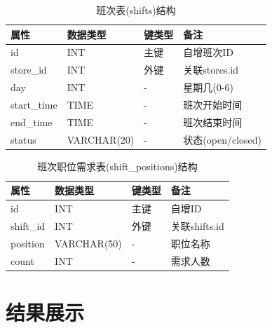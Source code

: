 \documentclass{ctexart}
\begin{document}
\begin{table}[H]
    \centering
    \caption{班次表(shifts)结构}
    \label{tab:shifts-table}
    \begin{tabular}{llll}
    \toprule
    属性 & 数据类型 & 键类型 & 备注 \\
    \midrule
    id & INT & 主键 & 自增班次ID \\
    store\_id & INT & 外键 & 关联stores.id \\
    day & INT & - & 星期几(0-6) \\
    start\_time & TIME & - & 班次开始时间 \\
    end\_time & TIME & - & 班次结束时间 \\
    status & VARCHAR(20) & - & 状态(open/closed) \\
    \bottomrule
    \end{tabular}
\end{table}

\begin{table}[H]
    \centering
    \caption{班次职位需求表(shift\_positions)结构}
    \label{tab:shift-positions-table}
    \begin{tabular}{llll}
    \toprule
    属性 & 数据类型 & 键类型 & 备注 \\
    \midrule
    id & INT & 主键 & 自增ID \\
    shift\_id & INT & 外键 & 关联shifts.id \\
    position & VARCHAR(50) & - & 职位名称 \\
    count & INT & - & 需求人数 \\
    \bottomrule
    \end{tabular}
\end{table}



\section{结果展示}
\end{document}
